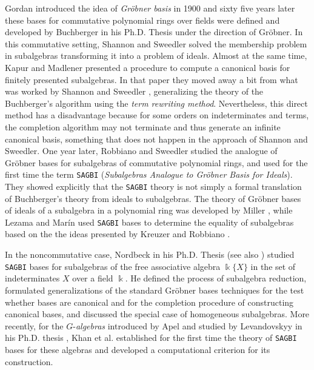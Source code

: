 \documentclass{amsart}
\theoremstyle{definition}
\theoremstyle{remark}
\numberwithin{equation}{section}
\begin{document}
Gordan \cite{Gordan1900} introduced the idea of {\em Gr\"obner basis} in 1900 and sixty five years later these bases for commutative polynomial rings over fields were defined and developed by Buchberger in his Ph.D. Thesis \cite{Buchberger1965} under the direction of Gr\"obner. In this commutative setting, Shannon and Sweedler \cite{ShannonSweedler1989} solved the membership problem in subalgebras transforming it into a problem of ideals.  Almost at the same time, Kapur and Madlener \cite{KapurMadlener1989} presented a procedure to compute a canonical basis for finitely presented subalgebras. In that paper they moved away a bit from what was worked by Shannon and Sweedler \cite{ShannonSweedler1989}, generalizing the theory of the Buchberger's algorithm using the {\em term rewriting method}. Nevertheless, this direct method has a disadvantage because for some orders on indeterminates and terms, the completion algorithm may not terminate and thus generate an infinite canonical basis, something that does not happen in the approach of Shannon and Sweedler. One year later, Robbiano and Sweedler \cite{RobbianoSweedler1990} studied the analogue of Gr\"obner bases for subalgebras of commutative polynomial rings, and used for the first time the term \texttt{SAGBI} ({\em Subalgebras Analogue to Gr\"obner Basis for Ideals}). They showed explicitly that the \texttt{SAGBI} theory is not simply a formal translation of Buchberger's theory from ideals to subalgebras. The theory of Gr\"obner bases of ideals of a subalgebra in a polynomial ring was developed by Miller \cite{Miller1998}, while Lezama and Mar\'in \cite{LezamaMarin2009} used \texttt{SAGBI} bases to determine the equality of subalgebras based on the the ideas presented by Kreuzer and Robbiano \cite{KreuzerRobbiano2005}. 

In the noncommutative case, Nordbeck in his Ph.D. Thesis \cite{NordbeckPhD2001} (see also \cite{Nordbeck1998, Nordbeck2002})  studied \texttt{SAGBI} bases for subalgebras of the free associative algebra $\Bbbk\{ X\}$ in the set of indeterminates $X$ over a field $\Bbbk$. He defined the process of subalgebra reduction, formulated generalizations of the standard Gr\"obner bases techniques for the test whether bases are canonical and for the completion procedure of constructing canonical bases, and discussed the special case of homogeneous subalgebras. More recently, for the $G$-{\em algebras} introduced by Apel \cite{Apel1988} and studied by Levandovskyy in his Ph.D. thesis \cite{Levandovskyy2005}, Khan et al. \cite{Khanetal2019} established for the first time the theory of \texttt{SAGBI} bases for these algebras and developed a computational criterion for its construction.
\end{document}
